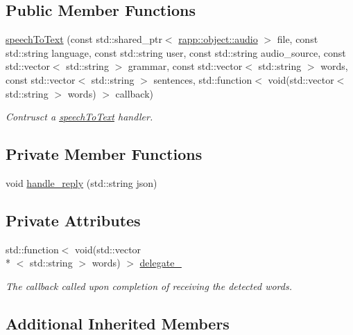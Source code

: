 \subsection*{Public Member Functions}
\begin{DoxyCompactItemize}
\item 
\hyperlink{classrapp_1_1cloud_1_1speechToText_a4e9fe20b037d501cad760f854d6ebf3d}{speech\-To\-Text} (const std\-::shared\-\_\-ptr$<$ \hyperlink{classrapp_1_1object_1_1audio}{rapp\-::object\-::audio} $>$ file, const std\-::string language, const std\-::string user, const std\-::string audio\-\_\-source, const std\-::vector$<$ std\-::string $>$ grammar, const std\-::vector$<$ std\-::string $>$ words, const std\-::vector$<$ std\-::string $>$ sentences, std\-::function$<$ void(std\-::vector$<$ std\-::string $>$ words) $>$ callback)
\begin{DoxyCompactList}\small\item\em Contrusct a \hyperlink{classrapp_1_1cloud_1_1speechToText}{speech\-To\-Text} handler. \end{DoxyCompactList}\end{DoxyCompactItemize}
\subsection*{Private Member Functions}
\begin{DoxyCompactItemize}
\item 
void \hyperlink{classrapp_1_1cloud_1_1speechToText_aac8bc1b1fb840a53f904e6a20347e54d}{handle\-\_\-reply} (std\-::string json)
\end{DoxyCompactItemize}
\subsection*{Private Attributes}
\begin{DoxyCompactItemize}
\item 
std\-::function$<$ void(std\-::vector\\*
$<$ std\-::string $>$ words) $>$ \hyperlink{classrapp_1_1cloud_1_1speechToText_a2b06ddad67ab4600f2179b7b04c01b51}{delegate\-\_\-}
\begin{DoxyCompactList}\small\item\em The callback called upon completion of receiving the detected words. \end{DoxyCompactList}\end{DoxyCompactItemize}
\subsection*{Additional Inherited Members}


